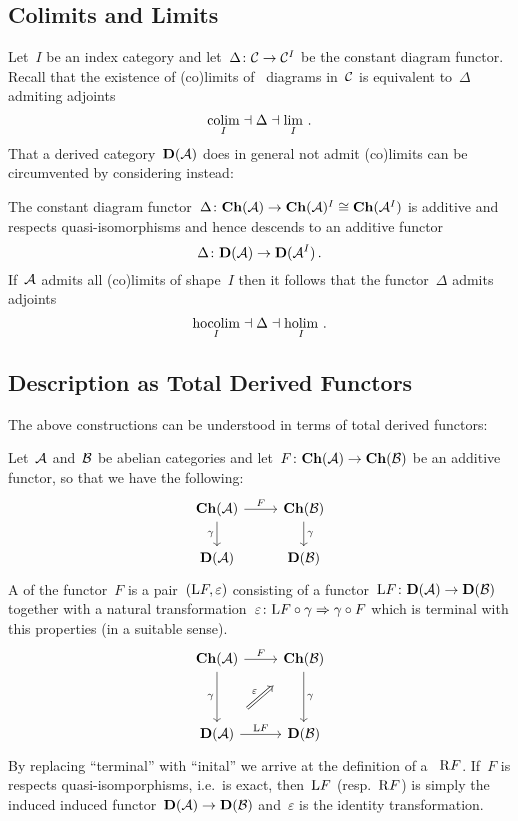 \documentclass[a4paper,10pt]{scrartcl}
\begin{document}
\subsection{Colimits and Limits}

Let~$I$ be an index category and let~$\Delta \colon \mathcal{C} \to \mathcal{C}^I$ be the constant diagram functor.
Recall that the existence of (co)limits of~{} diagrams in~$\mathcal{C}$ is equivalent to~$\Delta$ admiting adjoints
\[
  \operatorname*{colim}_I \mathrel{\dashv} \Delta \mathrel{\dashv} \lim_I \,.
\]
That a derived category~$\mathbf{D}(\mathcal{A})$ does in general not admit (co)limits can be circumvented by considering  instead:

The constant diagram functor~$\Delta \colon \mathbf{Ch}(\mathcal{A}) \to \mathbf{Ch}(\mathcal{A})^I \cong \mathbf{Ch}(\mathcal{A}^I)$ is additive and respects quasi-isomorphisms and hence descends to an additive functor
\[
  \Delta
  \colon
  \mathbf{D}(\mathcal{A}) \to \mathbf{D}(\mathcal{A}^I) \,.
\]
If~$\mathcal{A}$ admits all (co)limits of shape~$I$ then it follows that the functor~$\Delta$ admits adjoints
\[
  \operatorname*{hocolim}_I \mathrel{\dashv} \Delta \mathrel{\dashv} \operatorname*{holim}_I \,.
\]



\subsection{Description as Total Derived Functors}

The above constructions can be understood in terms of total derived functors:

Let~$\mathcal{A}$ and~$\mathcal{B}$ be abelian categories and let~$F \colon \mathbf{Ch}(\mathcal{A}) \to \mathbf{Ch}(\mathcal{B})$ be an additive functor, so that we have the following:
\[
  \begin{tikzcd}
    \Ch(\Acat)
    \arrow{r}[above]{F}
    \arrow{d}[left]{\gamma}
    &
    \Ch(\Bcat)
    \arrow{d}[right]{\gamma}
    \\
    \Derived(\Acat)
    &
    \Derived(\Bcat)
  \end{tikzcd}
\]
A  of the functor~$F$ is a pair~$(\mathrm{L} F, \varepsilon)$ consisting of a functor~$\mathrm{L} F \colon \mathbf{D}(\mathcal{A}) \to \mathbf{D}(\mathcal{B})$ together with a natural transformation~$\varepsilon \colon \mathrm{L} F \circ \gamma \Rightarrow \gamma \circ F$ which is terminal with this properties (in a suitable sense).
\[
  \begin{tikzcd}[row sep = huge]
    \Ch(\Acat)
    \arrow{r}[above]{F}
    \arrow{d}[left]{\gamma}
    &
    \Ch(\Bcat)
    \arrow{d}[right]{\gamma}
    \\
    \Derived(\Acat)
    \arrow{r}[above]{\Left F}
    \arrow[Rightarrow, shorten <= 1.5em, shorten >= 1.5em]{ur}[above left]{\varepsilon}
    &
    \Derived(\Bcat)
  \end{tikzcd}
\]
By replacing \enquote{terminal} with \enquote{inital} we arrive at the definition of a ~$\mathrm{R} F$.
If~$F$ is respects quasi-isomporphisms, i.e.\ is exact, then~$\mathrm{L} F$ (resp.~$\mathrm{R} F$) is simply the induced induced functor~$\mathbf{D}(\mathcal{A}) \to \mathbf{D}(\mathcal{B})$ and~$\varepsilon$ is the identity transformation.
\end{document}
